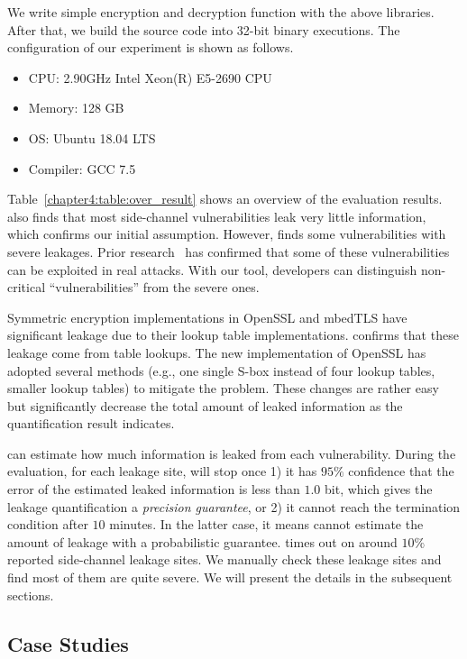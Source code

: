 We write simple encryption and decryption function with the above libraries. After that, we build
the source code into 32-bit binary executions. The configuration of our experiment is shown as follows.
\begin{itemize}
\item CPU: 2.90GHz Intel Xeon(R) E5-2690 CPU
\item Memory: 128 GB
\item OS: Ubuntu 18.04 LTS
\item Compiler: GCC 7.5
\end{itemize}

Table~\ref{chapter4:table:over_result} shows an overview of the evaluation results. 
\tool{} also finds that most side-channel
vulnerabilities leak very little information, which confirms our
initial assumption.  
However, \tool{} finds some vulnerabilities with severe
leakages. Prior research~\cite{Bonneau11894063_16,Gullasch:2011:CGB:2006077.2006784} has confirmed that some of these
vulnerabilities can be exploited in real attacks.
With our tool, developers can
distinguish non-critical ``vulnerabilities'' from the severe ones.

Symmetric encryption implementations in OpenSSL and mbedTLS have significant leakage due to their lookup table implementations. 
\tool{} confirms that these leakage come from table lookups. The new implementation of OpenSSL has adopted several methods (e.g., one single S-box instead of four lookup tables, smaller lookup tables) to mitigate the problem. These changes are rather easy but significantly decrease the total amount of leaked information as the quantification result indicates.

\tool{} can estimate how
much information is leaked from each vulnerability. During the evaluation,
for each leakage site, \tool{} will stop once 1) it has $95\%$ confidence
that the error of the estimated leaked information is less than $1.0$ bit,
which gives the leakage quantification a \emph{precision guarantee}, 
or 2) it cannot reach the termination condition after $10$ minutes.  In
the latter case, it means \tool{} cannot estimate the amount of leakage with a
probabilistic guarantee. \tool{} times out on around $10\%$ reported side-channel leakage sites. We manually check these leakage sites and find most of them are quite severe.
We will present the details in the subsequent sections.

\subsection{Case Studies}

